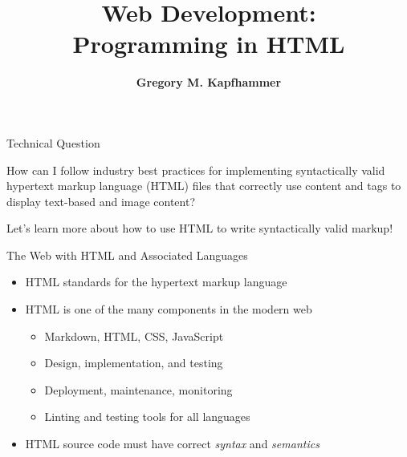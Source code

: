 \documentclass[14pt,aspectratio=169]{beamer}
\title{Web Development: \\ Programming in HTML}
\author{{\bf Gregory M. Kapfhammer}}
\institute[shortinst]{{\bf Department of Computer Science, Allegheny College}}
\begin{document}
{
  \begin{frame}
    \titlepage
  \end{frame}
}

%
\begin{frame}{Technical Question}
  \hspace*{.25in}
  \vspace*{.2in}
  \begin{center}
    {\large How can I follow industry best practices for implementing
      syntactically valid hypertext markup language (HTML) files that correctly
    use content and tags to display text-based and image content?}
  \end{center}
  \vspace{1ex}
  \begin{center}
    \small Let's learn more about how to use HTML to write syntactically valid markup!
  \end{center}
\end{frame}

%
\begin{frame}{The Web with HTML and Associated Languages}
%
  \begin{itemize}
    \item HTML standards for the hypertext markup language
    \item HTML is one of the many components in the modern web
      \begin{itemize}
        \item Markdown, HTML, CSS, JavaScript
        \item Design, implementation, and testing
        \item Deployment, maintenance, monitoring
        \item Linting and testing tools for all languages
      \end{itemize}
    \item HTML source code must have correct {\em syntax} and {\em semantics}
  \end{itemize}
%
\end{frame}
\end{document}
